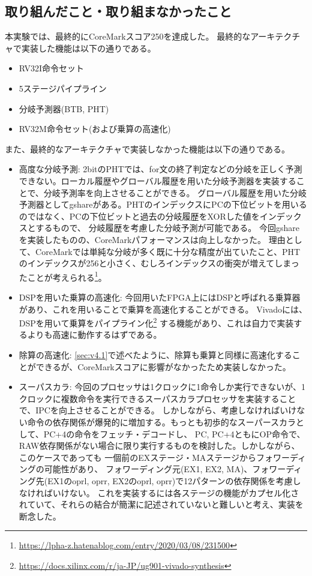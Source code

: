 \documentclass[dvipdfmx,10pt,a4paper,titlepage]{jsarticle}
\begin{document}
    \subsection{取り組んだこと・取り組まなかったこと}
    本実験では、最終的にCoreMarkスコア250を達成した。
    最終的なアーキテクチャで実装した機能は以下の通りである。
    \begin{itemize}
        \item RV32I命令セット
        \item 5ステージパイプライン
        \item 分岐予測器(BTB, PHT)
        \item RV32M命令セット(および乗算の高速化)
    \end{itemize}
    また、最終的なアーキテクチャで実装しなかった機能は以下の通りである。
    \begin{itemize}
        \item 高度な分岐予測:
        2bitのPHTでは、for文の終了判定などの分岐を正しく予測できない。ローカル履歴やグローバル履歴を用いた分岐予測器を実装することで、分岐予測率を向上させることができる。
        グローバル履歴を用いた分岐予測器としてgshareがある。PHTのインデックスにPCの下位ビットを用いるのではなく、PCの下位ビットと過去の分岐履歴をXORした値をインデックスとするもので、
        分岐履歴を考慮した分岐予測が可能である。
        今回gshareを実装したものの、CoreMarkパフォーマンスは向上しなかった。
        理由として、CoreMarkでは単純な分岐が多く既に十分な精度が出ていたこと、PHTのインデックスが256と小さく、むしろインデックスの衝突が増えてしまったことが考えられる\footnote{\url{https://lpha-z.hatenablog.com/entry/2020/03/08/231500}}。
        \item DSPを用いた乗算の高速化:
        今回用いたFPGA上にはDSPと呼ばれる乗算器があり、これを用いることで乗算を高速化することができる。
        Vivadoには、DSPを用いて乗算をパイプライン化\footnote{\url{https://docs.xilinx.com/r/ja-JP/ug901-vivado-synthesis}}
        する機能があり、これは自力で実装するよりも高速に動作するはずである。
        \item 除算の高速化: 
        \ref{sec:v4.1}で述べたように、除算も乗算と同様に高速化することができるが、CoreMarkスコアに影響がなかったため実装しなかった。
        \item スーパスカラ: 
        今回のプロセッサは1クロックに1命令しか実行できないが、1クロックに複数命令を実行できるスーパスカラプロセッサを実装することで、IPCを向上させることができる。
        しかしながら、考慮しなければいけない命令の依存関係が爆発的に増加する。もっとも初歩的なスーパースカラとして、PC+4の命令をフェッチ・デコードし、
        PC, PC+4ともにOP命令で、RAW依存関係がない場合に限り実行するものを検討した。しかしながら、このケースであっても
        一個前のEXステージ・MAステージからフォワーディングの可能性があり、
        フォワーディング元(EX1, EX2, MA)、フォワーディング先(EX1のoprl, oprr, EX2のoprl, oprr)で12パターンの依存関係を考慮しなければいけない。
        これを実装するには各ステージの機能がカプセル化されていて、それらの結合が簡潔に記述されていないと難しいと考え、実装を断念した。
    \end{itemize}
\end{document}
